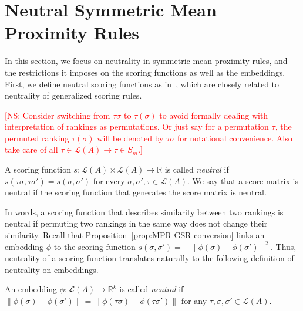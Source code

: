 \documentclass[10pt,letterpaper]{article}
\newcommand{\calL}{{\mathcal{L}}}
\newcommand{\rank}{{\calL(A)}}
\newenvironment{definition}[1][Definition]{\begin{trivlist}
\item[\hskip \labelsep {\bfseries #1}]}{\end{trivlist}}
\newcommand{\kibitz}[2]{\ifnum\Comments=1\textcolor{#1}{#2}\fi}
\newcommand{\cns}[1]{\kibitz{red} {[NS: #1]}}
\begin{document}

\section{Neutral Symmetric Mean Proximity Rules}

In this section, we focus on neutrality in symmetric mean proximity rules, and the restrictions it imposes on the scoring functions as well as the embeddings. First, we define neutral scoring functions as in~\cite{CRX09}, which are closely related to neutrality of generalized scoring rules. 

\cns{Consider switching from $\tau \sigma$ to $\tau(\sigma)$ to avoid formally dealing with interpretation of rankings as permutations. Or just say for a permutation $\tau$, the permuted ranking $\tau(\sigma)$ will be denoted by $\tau \sigma$ for notational convenience. Also take care of all $\tau \in \rank \rightarrow \tau \in S_m$.}


\begin{definition}[Neutral Scoring Function]
A scoring function $s: \rank \times \rank \rightarrow \mathbb{R}$ is called \emph{neutral} if $s(\tau \sigma, \tau \sigma') = s(\sigma,\sigma')$ for every $\sigma,\sigma',\tau \in \rank$. We say that a score matrix is neutral if the scoring function that generates the score matrix is neutral. 
\end{definition}
In words, a scoring function that describes similarity between two rankings is neutral if permuting two rankings in the same way does not change their similarity. Recall that Proposition~\ref{prop:MPR-GSR-conversion} links an embedding $\phi$ to the scoring function $s(\sigma,\sigma') = -\|\phi(\sigma)-\phi(\sigma')\|^2$. Thus, neutrality of a scoring function translates naturally to the following definition of neutrality on embeddings.


\begin{definition}[Neutral Embedding]
An embedding $\phi:\rank \rightarrow \mathbb{R}^k$ is called \emph{neutral} if $\|\phi(\sigma)-\phi(\sigma')\| = \|\phi(\tau \sigma)-\phi(\tau\sigma')\|$ for any $\tau,\sigma,\sigma' \in \rank$.
\end{definition}
\end{document}
